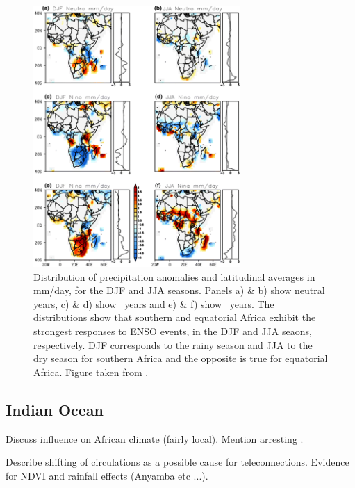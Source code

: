 \begin{figure}
  \centering
  \includegraphics[width=0.7\textwidth]{figures/enso_africa_rainfall_anoms}
  \caption{Distribution of precipitation anomalies and latitudinal averages in
    mm/day, for the DJF and JJA seasons. Panels a) \& b) show neutral years, c)
    \& d) show \elnino\ years and e) \& f) show \nina\ years. The distributions
    show that southern and equatorial Africa exhibit the strongest responses to
    ENSO events, in the DJF and JJA seaons, respectively. DJF corresponds to the
    rainy season and JJA to the dry season for southern Africa and the opposite
    is true for equatorial Africa. Figure taken from \cite{deoliveira2018}.}
  \label{fig:enso_rainfall_anoms}
\end{figure}

\subsection{Indian Ocean}
Discuss influence on African climate (fairly local). Mention arresting .



Describe shifting of circulations as a possible cause for
teleconnections. Evidence for NDVI and rainfall effects (Anyamba etc ...).
